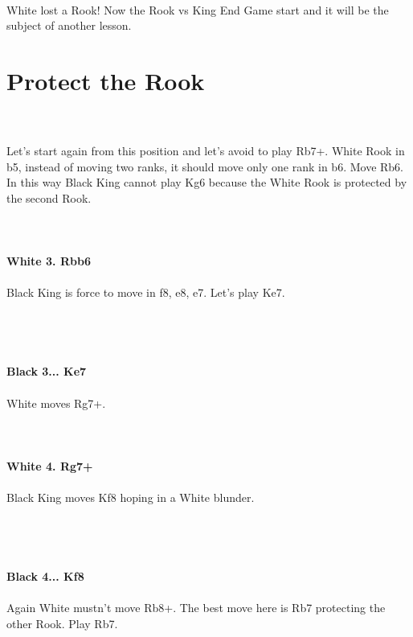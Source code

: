 \documentclass{article}
\begin{document}
\\
White lost a Rook! Now the Rook vs King End Game start and it will be the subject of another lesson.\section{ Protect the Rook}

\\
\\
Let's start again from this position and let's avoid to play Rb7+. White Rook in b5, instead of moving two ranks, it should move only one rank in b6. Move Rb6. In this way Black King cannot play Kg6 because the White Rook is protected by the second Rook.\\\\

\\
\\
\textbf{White 3. Rbb6}\\
\\
Black King is force to move in f8, e8, e7. Let's play Ke7.\\\\
\\

\\
\\
\textbf{Black 3... Ke7}\\
\\
White moves Rg7+.\\
\\

\\
\\
\textbf{White 4. Rg7+}\\
\\
Black King moves Kf8 hoping in a White blunder.\\\\
\\

\\
\\
\textbf{Black 4... Kf8}\\
\\
Again White mustn't move Rb8+. The best move here is Rb7 protecting the other Rook. Play Rb7.\\
\\
\end{document}
